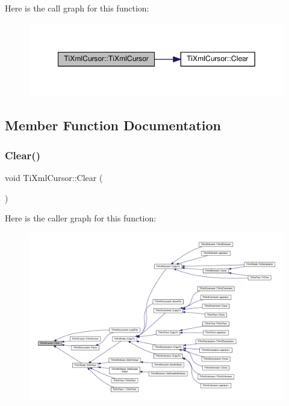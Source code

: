 Here is the call graph for this function\+:
\nopagebreak
\begin{figure}[H]
\begin{center}
\leavevmode
\includegraphics[width=349pt]{struct_ti_xml_cursor_a7ad233928a675f0271eb440b150e3ff1_cgraph}
\end{center}
\end{figure}


\subsection{Member Function Documentation}
\mbox{\label{struct_ti_xml_cursor_a1e6fa622b59dafb71b6efe595105dcdd}} 
\subsubsection{\texorpdfstring{Clear()}{Clear()}}
{\footnotesize\ttfamily void Ti\+Xml\+Cursor\+::\+Clear (\begin{DoxyParamCaption}{ }\end{DoxyParamCaption})\hspace{0.3cm}{\ttfamily [inline]}}

Here is the caller graph for this function\+:
\nopagebreak
\begin{figure}[H]
\begin{center}
\leavevmode
\includegraphics[width=350pt]{struct_ti_xml_cursor_a1e6fa622b59dafb71b6efe595105dcdd_icgraph}
\end{center}
\end{figure}


